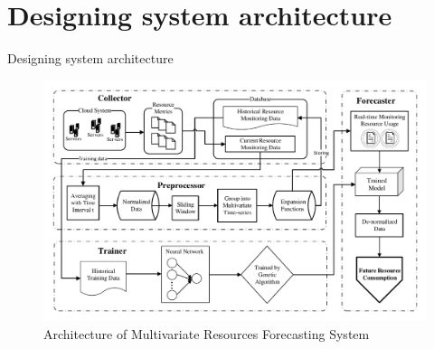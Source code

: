 \documentclass{beamer}
\begin{document}
\section{Designing system architecture}
\begin{frame}{Designing system architecture}
	\begin{figure}
		\centering
		\includegraphics[scale=0.42]{FLGANN_system.pdf}
		\caption*{Architecture of Multivariate Resources Forecasting System}
		\label{fig:overall}
	\end{figure}
\end{frame}
\end{document}
